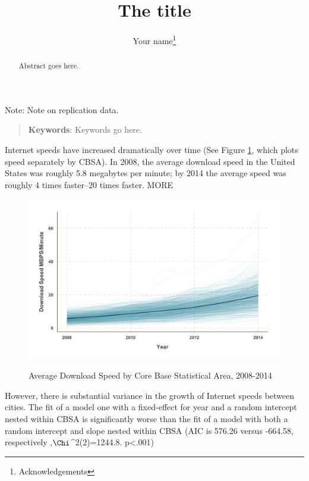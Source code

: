 \documentclass[12pt, letterpaper]{article}
\title{The title}
\author{Your name\thanks{Acknowledgements}}
\begin{document}
 
\maketitle
\doublespacing
\vspace{5.5in}
\noindent Note: Note on replication data.
\thispagestyle{empty}
\newpage
\thispagestyle{empty}
\begin{abstract}
\begin{normalsize}
\noindent Abstract goes here.

\end{normalsize}
\end{abstract}

\begin{quote}
\textbf{Keywords}: Keywords go here.
\end{quote}
\newpage
Internet speeds have increased dramatically over time (See Figure \ref{fig:speed_cbsa}, which plots speed separately by CBSA). In 2008, the average download speed in the United States was roughly 5.8 megabytes per minute; by 2014 the average speed was roughly 4 times faster--20 times faster. MORE

\begin{figure}
\centering
\caption{Average Download Speed by Core Base Statistical Area, 2008-2014}
\includegraphics[width=\textwidth]{Graphs/speed_by_cbsa}
\label{fig:speed_cbsa}
\end{figure}

However, there is substantial variance in the growth of Internet speeds between cities. The fit of a model one with a fixed-effect for year and a random intercept nested within CBSA is significantly worse than the fit of a model with both a random intercept and slope nested within CBSA (AIC is 576.26 versus -664.58, respectively ,$\Chi$^2(2)=1244.8. p<.001)



\newpage



\end{document}
